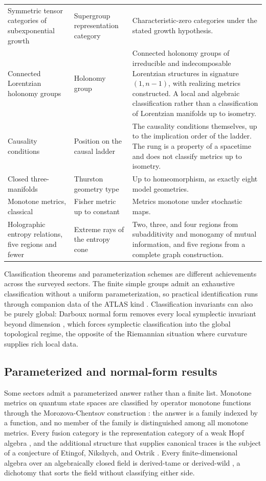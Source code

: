 \documentclass[11pt,letterpaper]{article}
\theoremstyle{definition}
\theoremstyle{remark}
\begin{document}
\begin{xltabular}{\textwidth}{Y{0.95}Y{1.10}Y{0.95}}
Symmetric tensor categories of subexponential growth \cite{corpus-13} & Supergroup representation category & Characteristic-zero categories under the stated growth hypothesis. \\
Connected Lorentzian holonomy groups \cite{corpus-51} & Holonomy group & Connected holonomy groups of irreducible and indecomposable Lorentzian structures in signature $(1,n-1)$, with realizing metrics constructed. A local and algebraic classification rather than a classification of Lorentzian manifolds up to isometry. \\
Causality conditions \cite{corpus-50} & Position on the causal ladder & The causality conditions themselves, up to the implication order of the ladder. The rung is a property of a spacetime and does not classify metrics up to isometry. \\
Closed three-manifolds \cite{corpus-60,corpus-70} & Thurston geometry type & Up to homeomorphism, as exactly eight model geometries. \\
Monotone metrics, classical \cite{corpus-52} & Fisher metric up to constant & Metrics monotone under stochastic maps. \\
Holographic entropy relations, five regions and fewer \cite{corpus-47,corpus-73} & Extreme rays of the entropy cone & Two, three, and four regions from subadditivity and monogamy of mutual information, and five regions from a complete graph construction. \\
\end{xltabular}
\endgroup

Classification theorems and parameterization schemes are different achievements across the surveyed sectors. The finite simple groups admit an exhaustive classification without a uniform parameterization, so practical identification runs through companion data of the ATLAS kind \cite{corpus-3}. Classification invariants can also be purely global: Darboux normal form removes every local symplectic invariant beyond dimension \cite{corpus-6}, which forces symplectic classification into the global topological regime, the opposite of the Riemannian situation where curvature supplies rich local data.

\subsection{Parameterized and normal-form results}

Some sectors admit a parameterized answer rather than a finite list. Monotone metrics on quantum state spaces are classified by operator monotone functions through the Morozova-Chentsov construction \cite{corpus-52}: the answer is a family indexed by a function, and no member of the family is distinguished among all monotone metrics. Every fusion category is the representation category of a weak Hopf algebra \cite{corpus-75}, and the additional structure that supplies canonical traces is the subject of a conjecture of Etingof, Nikshych, and Ostrik \cite{corpus-14}. Every finite-dimensional algebra over an algebraically closed field is derived-tame or derived-wild \cite{corpus-55}, a dichotomy that sorts the field without classifying either side.
\end{document}
